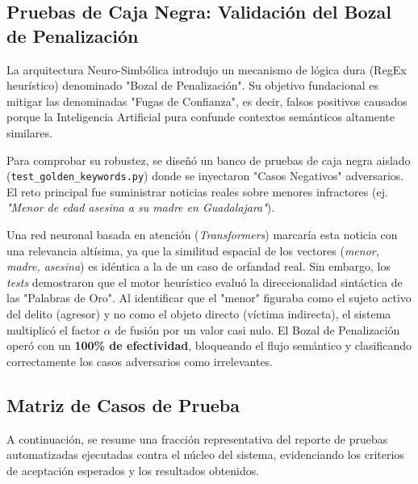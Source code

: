 \subsection{Pruebas de Caja Negra: Validación del Bozal de Penalización}
\label{subsec:pruebas_caja_negra}

La arquitectura Neuro-Simbólica introdujo un mecanismo de lógica dura (RegEx heurístico) denominado "Bozal de Penalización". Su objetivo fundacional es mitigar las denominadas "Fugas de Confianza", es decir, falsos positivos causados porque la Inteligencia Artificial pura confunde contextos semánticos altamente similares.

Para comprobar su robustez, se diseñó un banco de pruebas de caja negra aislado (\texttt{test\_golden\_keywords.py}) donde se inyectaron "Casos Negativos" adversarios. El reto principal fue suministrar noticias reales sobre menores infractores (ej. \textit{"Menor de edad asesina a su madre en Guadalajara"}). 

Una red neuronal basada en atención (\textit{Transformers}) marcaría esta noticia con una relevancia altísima, ya que la similitud espacial de los vectores (\textit{menor, madre, asesina}) es idéntica a la de un caso de orfandad real. Sin embargo, los \textit{tests} demostraron que el motor heurístico evaluó la direccionalidad sintáctica de las "Palabras de Oro". Al identificar que el "menor" figuraba como el sujeto activo del delito (agresor) y no como el objeto directo (víctima indirecta), el sistema multiplicó el factor $\alpha$ de fusión por un valor casi nulo. El Bozal de Penalización operó con un \textbf{100\% de efectividad}, bloqueando el flujo semántico y clasificando correctamente los casos adversarios como irrelevantes.

\subsection{Matriz de Casos de Prueba}

A continuación, se resume una fracción representativa del reporte de pruebas automatizadas ejecutadas contra el núcleo del sistema, evidenciando los criterios de aceptación esperados y los resultados obtenidos.

